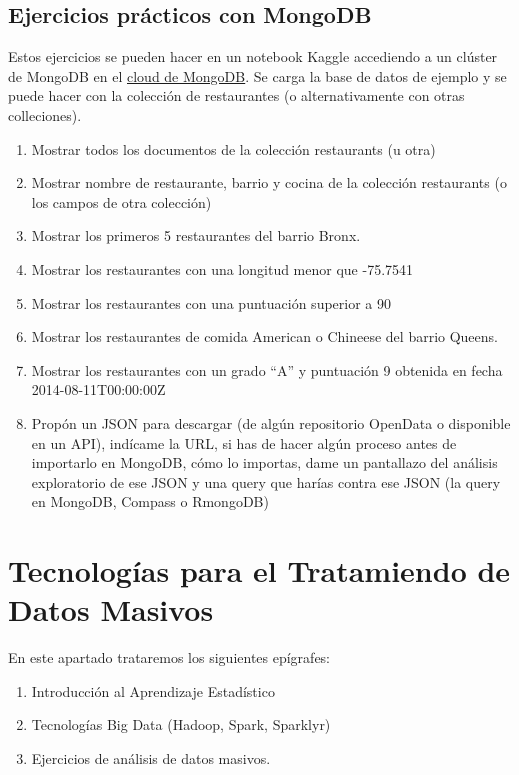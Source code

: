 \documentclass[
]{book}
\begin{document}
\hypertarget{ejercicios-pruxe1cticos-con-mongodb}{%
\section{Ejercicios prácticos con MongoDB}\label{ejercicios-pruxe1cticos-con-mongodb}}

Estos ejercicios se pueden hacer en un notebook Kaggle accediendo a un clúster de MongoDB en el \href{https://cloud.mongodb.com}{cloud de MongoDB}. Se carga la base de datos de ejemplo y se puede hacer con la colección de restaurantes (o alternativamente con otras colleciones).

\begin{enumerate}
\def\labelenumi{\arabic{enumi}.}
\item
  Mostrar todos los documentos de la colección restaurants (u otra)
\item
  Mostrar nombre de restaurante, barrio y cocina de la colección restaurants (o los campos de otra colección)
\item
  Mostrar los primeros 5 restaurantes del barrio Bronx.
\item
  Mostrar los restaurantes con una longitud menor que -75.7541
\item
  Mostrar los restaurantes con una puntuación superior a 90
\item
  Mostrar los restaurantes de comida American o Chineese del barrio Queens.
\item
  Mostrar los restaurantes con un grado ``A'' y puntuación 9 obtenida en fecha 2014-08-11T00:00:00Z
\item
  Propón un JSON para descargar (de algún repositorio OpenData o disponible en un API), indícame la URL, si has de hacer algún proceso antes de importarlo en MongoDB, cómo lo importas, dame un pantallazo del análisis exploratorio de ese JSON y una query que harías contra ese JSON (la query en MongoDB, Compass o RmongoDB)
\end{enumerate}

\hypertarget{tecnologuxedas-para-el-tratamiendo-de-datos-masivos}{%
\chapter{Tecnologías para el Tratamiendo de Datos Masivos}\label{tecnologuxedas-para-el-tratamiendo-de-datos-masivos}}

En este apartado trataremos los siguientes epígrafes:

\begin{enumerate}
\def\labelenumi{\arabic{enumi}.}
\item
  Introducción al Aprendizaje Estadístico
\item
  Tecnologías Big Data (Hadoop, Spark, Sparklyr)
\item
  Ejercicios de análisis de datos masivos.
\end{enumerate}
\end{document}
